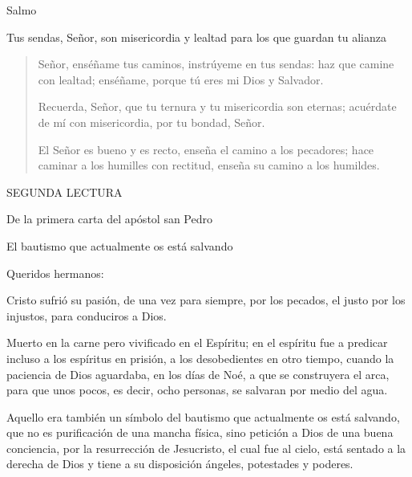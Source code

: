 \begin{readbook}Salmo \end{readbook}

\begin{readtheme}Tus sendas, Señor, son misericordia y lealtad para los que guardan tu alianza\end{readtheme}

\begin{verse} 
	 Señor, enséñame tus caminos,
	instrúyeme en tus sendas:
	haz que camine con lealtad;
 	enséñame, porque tú eres mi Dios y Salvador.
 	
	 Recuerda, Señor, que tu ternura
 	y tu misericordia son eternas;
 	acuérdate de mí con misericordia,
 	por tu bondad, Señor. 
 	
	 El Señor es bueno y es recto,
 	enseña el camino a los pecadores;
 	hace caminar a los humilles con rectitud,
 	enseña su camino a los humildes.  
\end{verse}

\begin{readtitle}SEGUNDA LECTURA\end{readtitle}

\begin{readbook}De la primera carta del apóstol san Pedro \end{readbook}

\begin{readtheme}El bautismo que actualmente os está salvando\end{readtheme}

\begin{readbody}Queridos hermanos:\end{readbody}

\begin{readbody}Cristo sufrió su pasión, de una vez para siempre, por los pecados, el justo por los injustos, para conduciros a Dios.\end{readbody}

\begin{readbody}Muerto en la carne pero vivificado en el Espíritu; en el espíritu fue a predicar incluso a los espíritus en prisión, a los desobedientes en otro tiempo, cuando la paciencia de Dios aguardaba, en los días de Noé, a que se construyera el arca, para que unos pocos, es decir, ocho personas, se salvaran por medio del agua.\end{readbody}

\begin{readbody}Aquello era también un símbolo del bautismo que actualmente os está salvando, que no es purificación de una mancha física, sino petición a Dios de una buena conciencia, por la resurrección de Jesucristo, el cual fue al cielo, está sentado a la derecha de Dios y tiene a su disposición ángeles, potestades y poderes.\end{readbody}

